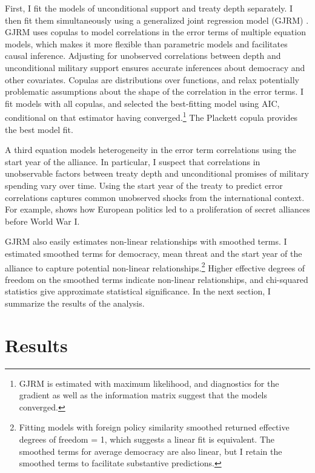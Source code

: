 \documentclass[12pt]{article}
\begin{document}
First, I fit the models of unconditional support and treaty depth separately. 
I then fit them simultaneously using a generalized joint regression model (GJRM) \citep{Braumoelleretal2018}.
GJRM uses copulas to model correlations in the error terms of multiple equation models, which makes it more flexible than parametric models and facilitates causal inference. 
Adjusting for unobserved correlations between depth and unconditional military support ensures accurate inferences about democracy and other covariates. 
Copulas are distributions over functions, and relax potentially problematic assumptions about the shape of the correlation in the error terms. 
I fit models with all copulas, and selected the best-fitting model using AIC, conditional on that estimator having converged.\footnote{GJRM is estimated with maximum likelihood, and diagnostics for the gradient as well as the information matrix suggest that the models converged.} 
The Plackett copula provides the best model fit.


A third equation models heterogeneity in the error term correlations using the start year of the alliance. 
In particular, I suspect that correlations in unobservable factors between treaty depth and unconditional promises of military spending vary over time. 
Using the start year of the treaty to predict error correlations captures common unobserved shocks from the international context. 
For example, \citet{Kuo2019} shows how European politics led to a proliferation of secret alliances before World War I. 


GJRM also easily estimates non-linear relationships with smoothed terms. 
I estimated smoothed terms for democracy, mean threat and the start year of the alliance to capture potential non-linear relationships.\footnote{Fitting models with foreign policy similarity smoothed returned effective degrees of freedom = 1, which suggests a linear fit is equivalent. The smoothed terms for average democracy are also linear, but I retain the smoothed terms to facilitate substantive predictions.}  
Higher effective degrees of freedom on the smoothed terms indicate non-linear relationships, and chi-squared statistics give approximate statistical significance. 
In the next section, I summarize the results of the analysis. 



\section{Results}
\end{document}
